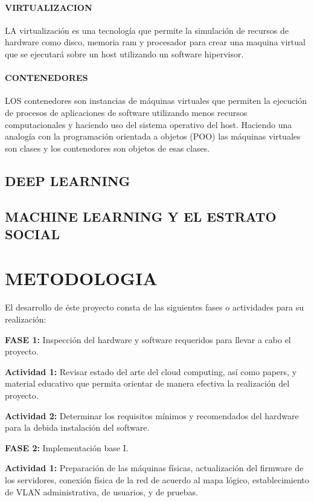	\subsubsection{VIRTUALIZACION}     
   	LA virtualización es una tecnología que permite la simulación de recursos de hardware como disco, memoria ram y procesador para crear una maquina virtual que se ejecutará sobre un host utilizando un software hipervisor.
        
    \subsubsection{CONTENEDORES}
    LOS contenedores son instancias de máquinas virtuales que permiten la ejecución de procesos de aplicaciones de software utilizando menos recursos computacionales y haciendo uso del sistema operativo del host. Haciendo una analogía con la programación orientada a objetos (POO) las máquinas virtuales son clases y los contenedores son objetos de esas clases.
    
    \section{DEEP LEARNING}
    \section{MACHINE LEARNING Y EL ESTRATO SOCIAL}
    
  
      \newpage\chapter{METODOLOGIA} 
    
    
    El desarrollo de éste proyecto consta de las siguientes fases o actividades para su realización: 
    
 \textbf{FASE 1:} Inspección del hardware y software requeridos para llevar a cabo el proyecto. 
 
 \textbf{Actividad 1:} Revisar estado del arte del cloud computing, así como papers, y             material educativo que permita orientar de manera efectiva la realización del           proyecto. 
 
 \textbf{Actividad 2:} Determinar los requisitos mínimos y recomendados del hardware para           la debida instalación del software. 
 
 \textbf{FASE 2:} Implementación base I. 
 
 \textbf{Actividad 1:} Preparación de las máquinas físicas, actualización del firmware de los servidores, conexión física de la red de acuerdo al mapa lógico, establecimiento de VLAN administrativa, de usuarios, y de pruebas. 
 
